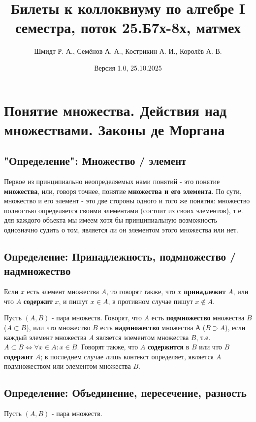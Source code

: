 \documentclass{article}
\title{Билеты к коллоквиуму по алгебре I семестра, поток 25.Б7х-8х, матмех}
\author{Шмидт Р. А., Семёнов А. А., Кострикин А. И., Королёв А. В.}
\date{Версия 1.0, 25.10.2025}
\begin{document}
\maketitle

\tableofcontents

\sloppy

\newpage
\section{Понятие множества. Действия над множествами. Законы де Моргана}
\subsection{"Определение": Множество / элемент}
Первое из принципиально неопределяемых нами понятий - это понятие \textbf{множества}, или, говоря точнее, понятие \textbf{множества и его элемента}. По сути, множество и его элемент - это две стороны одного и того же понятия: множество полностью определяется своими элементами (состоит из своих элементов), т.е. для каждого объекта мы имеем хотя бы принципиальную возможность однозначно судить о том, является ли он элементом этого множества или нет.

\subsection{Определение: Принадлежность, подмножество / надмножество}

Если $x$ есть элемент множества $A$, то говорят также, что $x$ \textbf{принадлежит} $A$, или что $A$ \textbf{содержит} $x$, и пишут $x \in A$, в противном случае пишут $x \notin A$.

Пусть $(A, B)$ - пара множеств. Говорят, что $A$ есть \textbf{подмножество} множества $B$ ($A \subset B$), или что множество $B$ есть \textbf{надмножество} множества А ($B \supset A$), если каждый элемент множества $A$ является элементом множества $B$, т.е. $A \subset B \Leftrightarrow \forall x \in A : x \in B$. Говорят также, что $A$ \textbf{содержится} в $B$ или что $B$ \textbf{содержит} $A$; в последнем случае лишь контекст определяет, является $A$ подмножеством или элементом множества $B$.

\subsection{Определение: Объединение, пересечение, разность}

Пусть $(A, B)$ - пара множеств.
\end{document}
